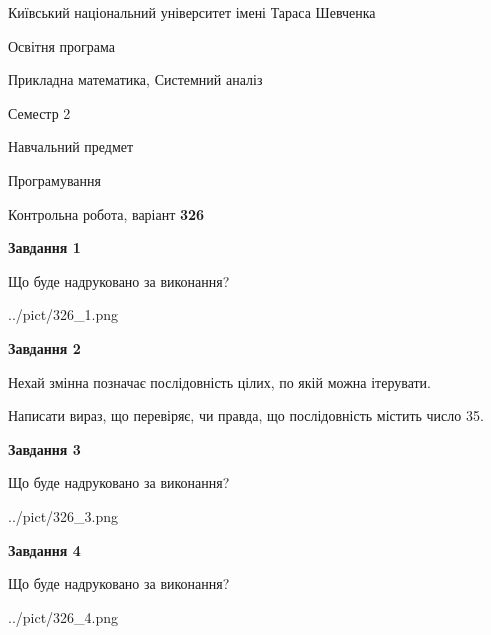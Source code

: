 \documentclass[12pt, ukrainian]{article}
\begin{document}
{{\begin {small}\par
{ \center  Київський національний університет імені Тараса Шевченка \par}
{\parbox {5 cm}{Освітня програма \hfill}{\parbox {8 cm}{Прикладна математика, Системний аналіз \hfill}}\parbox {5 cm}{\hfill Семестр 2}}\par
{\parbox {5 cm} {Навчальний предмет \hfill}\parbox {7 cm}{Програмування \hfill}\parbox {6cm}{\hfill}\par}\vspace{-7pt} \end{small}}{\center Контрольна робота, варіант  \No \textbf
{ 326 }\par}}
{
\begin {large}
{\begin {center}\textbf{Завдання 1}\end {center}}\par
Що буде надруковано за виконання?\par\par
\begin{center}
	{../pict/326_1.png}
\end{center}
\newpage

{\begin {center}\textbf{Завдання 2}\end {center}}\par
Нехай змінна  позначає послідовність цілих, по якій можна ітерувати.

Написати вираз, що перевіряє, чи правда, що послідовність  містить число 35.\par
\newpage

{\begin {center}\textbf{Завдання 3}\end {center}}\par
Що буде надруковано за виконання?
\begin{center}
	{../pict/326_3.png}
\end{center}
\newpage

{\begin {center}\textbf{Завдання 4}\end {center}}\par
Що буде надруковано за виконання?\par
\begin{center}
	{../pict/326_4.png}
\end{center}
\newpage


\end{large}}
\end{document}
